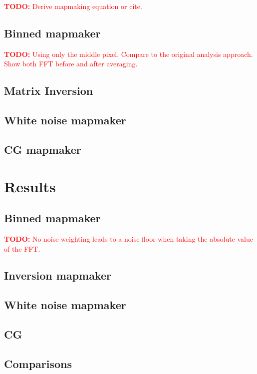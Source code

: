 \documentclass{aa}
\newcommand{\todo}[1]{\textcolor{red}{\textbf{TODO:} #1}}
\begin{document}
\todo{Derive mapmaking equation or cite.}

\subsection{Binned mapmaker}

\todo{Using only the middle pixel. Compare to the original analysis approach. Show both FFT before and after averaging.}

\subsection{Matrix Inversion}

\subsection{White noise mapmaker}

\subsection{CG mapmaker}

\section{Results}

\subsection{Binned mapmaker}

\todo{No noise weighting leads to a noise floor when taking the absolute value of the FFT.}

\subsection{Inversion mapmaker}

\subsection{White noise mapmaker}

\subsection{CG}

\subsection{Comparisons}
\end{document}
